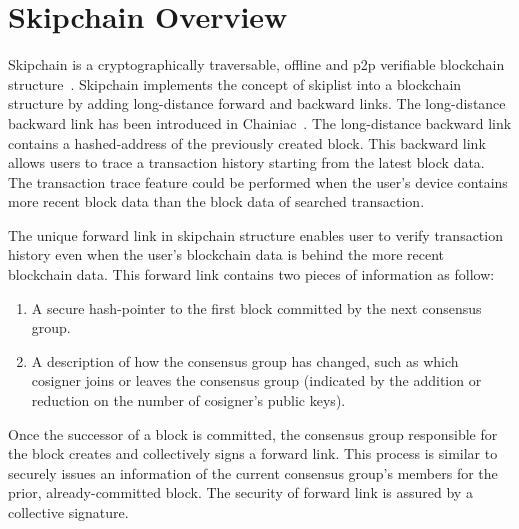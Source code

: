 \section{Skipchain Overview}
\label{sec:2_overview}

Skipchain is a cryptographically traversable, offline and p2p verifiable blockchain structure~\cite{Skipchain}. Skipchain implements the concept of skiplist into a blockchain structure by adding long-distance forward and backward links. The long-distance backward link has been introduced in Chainiac~\cite{chainiac}. The long-distance backward link contains a hashed-address of the previously created block. This backward link allows users to trace a transaction history starting from the latest block data. The transaction trace feature could be performed when the user's device contains more recent block data than the block data of searched transaction.

The unique forward link in skipchain structure enables user to verify transaction history even when the user's blockchain data is behind the more recent blockchain data. This forward link contains two pieces of information as follow:
\begin{enumerate}
	\item A secure hash-pointer to the first block committed by the next consensus group.
	\item A description of how the consensus group has changed, such as which cosigner joins or leaves the consensus group (indicated by the addition or reduction on the number of cosigner's public keys).
\end{enumerate}
Once the successor of a block is committed, the consensus group responsible for the block creates and collectively signs a forward link. This process is similar to securely issues an information of the current consensus group's members for the prior, already-committed block. The security of forward link is assured by a collective signature.

